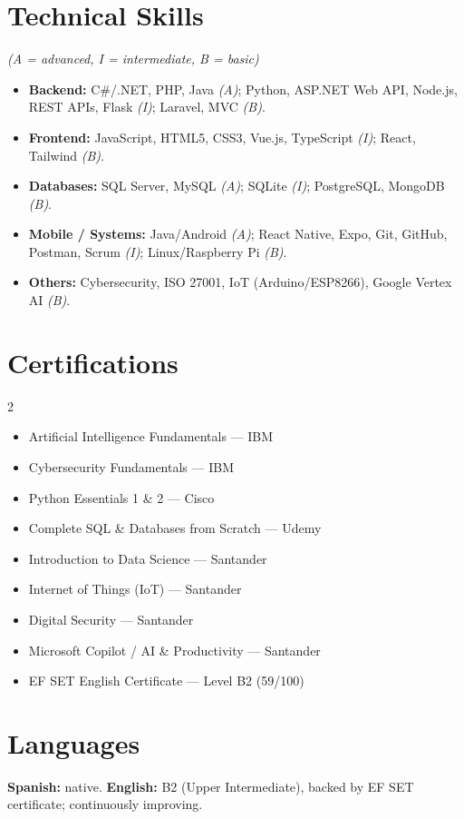 \documentclass[10pt,a4paper]{article}
\begin{document}
\section{Technical Skills} \textit{\small (A = advanced, I = intermediate, B = basic)}
\begin{itemize}
  \item \textbf{Backend:} C\#/.NET, PHP, Java \textit{(A)}; Python, ASP.NET Web API, Node.js, REST APIs, Flask \textit{(I)}; Laravel, MVC \textit{(B)}.
  \item \textbf{Frontend:} JavaScript, HTML5, CSS3, Vue.js, TypeScript \textit{(I)}; React, Tailwind \textit{(B)}.
  \item \textbf{Databases:} SQL Server, MySQL \textit{(A)}; SQLite \textit{(I)}; PostgreSQL, MongoDB \textit{(B)}.
  \item \textbf{Mobile / Systems:} Java/Android \textit{(A)}; React Native, Expo, Git, GitHub, Postman, Scrum \textit{(I)}; Linux/Raspberry Pi \textit{(B)}.
  \item \textbf{Others:} Cybersecurity, ISO 27001, IoT (Arduino/ESP8266), Google Vertex AI \textit{(B)}.
\end{itemize}

\section{Certifications}
{\small
\begin{multicols}{2}
\begin{itemize}
  \item Artificial Intelligence Fundamentals --- IBM
  \item Cybersecurity Fundamentals --- IBM
  \item Python Essentials 1 \& 2 --- Cisco
  \item Complete SQL \& Databases from Scratch --- Udemy
  \item Introduction to Data Science --- Santander
  \item Internet of Things (IoT) --- Santander
  \item Digital Security --- Santander
  \item Microsoft Copilot / AI \& Productivity --- Santander
  \item EF SET English Certificate --- Level B2 (59/100)
\end{itemize}
\end{multicols}}

\section{Languages}
\textbf{Spanish:} native. \qquad \textbf{English:} B2 (Upper Intermediate), backed by EF SET certificate; continuously improving.
\end{document}
